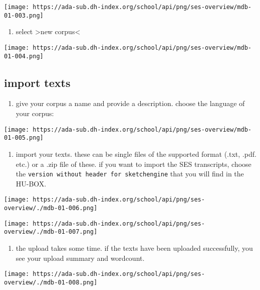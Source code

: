 \documentclass[
  12pt,
]{article}
\providecommand{\tightlist}{%
  \setlength{\itemsep}{0pt}\setlength{\parskip}{0pt}}
\begin{document}
\texttt{[image: https://ada-sub.dh-index.org/school/api/png/ses-overview/mdb-01-003.png]}

\begin{enumerate}
\def\labelenumi{\arabic{enumi}.}
\setcounter{enumi}{1}
\tightlist
\item
  select \textgreater new corpus\textless{}
\end{enumerate}

\texttt{[image: https://ada-sub.dh-index.org/school/api/png/ses-overview/mdb-01-004.png]}

\hypertarget{import-texts}{%
\subsection{import texts}\label{import-texts}}

\begin{enumerate}
\def\labelenumi{\arabic{enumi}.}
\tightlist
\item
  give your corpus a name and provide a description. choose the language
  of your corpus:
\end{enumerate}

\texttt{[image: https://ada-sub.dh-index.org/school/api/png/ses-overview/mdb-01-005.png]}

\begin{enumerate}
\def\labelenumi{\arabic{enumi}.}
\setcounter{enumi}{1}
\tightlist
\item
  import your texts. these can be single files of the supported format
  (.txt, .pdf. etc.) or a .zip file of these. if you want to import the
  SES transcripts, choose the
  \texttt{version\ without\ header\ for\ sketchengine} that you will
  find in the HU-BOX.
\end{enumerate}

\texttt{[image: https://ada-sub.dh-index.org/school/api/png/ses-overview/./mdb-01-006.png]}

\texttt{[image: https://ada-sub.dh-index.org/school/api/png/ses-overview/./mdb-01-007.png]}

\begin{enumerate}
\def\labelenumi{\arabic{enumi}.}
\setcounter{enumi}{2}
\tightlist
\item
  the upload takes some time. if the texts have been uploaded
  successfully, you see your upload summary and wordcount.
\end{enumerate}

\texttt{[image: https://ada-sub.dh-index.org/school/api/png/ses-overview/./mdb-01-008.png]}
\end{document}
